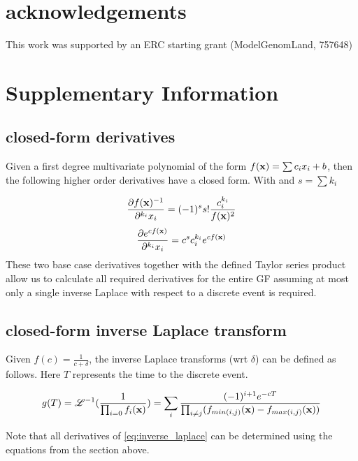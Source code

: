 \documentclass[10pt, a4]{article}
\newcommand{\beginsupplement}{%
        \setcounter{table}{0}
        \renewcommand{\thetable}{S\arabic{table}}%
        \setcounter{figure}{0}
        \renewcommand{\thefigure}{S\arabic{figure}}%
     }
\begin{document}
\section*{acknowledgements}
This work was supported by an ERC starting grant (ModelGenomLand, 757648)


\beginsupplement
\newpage
\section*{Supplementary Information}
\setcounter{equation}{0}
\setcounter{figure}{0}
\setcounter{table}{0}
\setcounter{page}{1}
\makeatletter
\renewcommand{\theequation}{S\arabic{equation}}
\renewcommand{\thefigure}{S\arabic{figure}}
\renewcommand{\bibnumfmt}[1]{[S#1]}
\renewcommand{\citenumfont}[1]{S#1}

\subsection*{closed-form derivatives}
Given a first degree multivariate polynomial of the form $f(\bold{x}) = \sum c_ix_i + b$, then the following higher order derivatives have a closed form. With and $s = \sum k_i$

\begin{equation} \label{eq:deriv_polynomial}
\frac{\partial f(\bold{x})^{-1}}{\partial^{k_i} x_i} = (-1)^s s! \frac{c^{k_i}_i}{f(\bold{x})^2}
\end{equation}
%
\begin{equation} \label{eq:deriv_exponential}
\frac{\partial e^{c f(\bold{x})}}{\partial^{k_i} x_i} = c^sc_i^{k_i}e^{cf(\bold{x})}	
\end{equation}
These two base case derivatives together with the defined Taylor series product allow us to calculate all required derivatives for the entire GF assuming at most only a single inverse Laplace with respect to a discrete event is required.

\subsection*{closed-form inverse Laplace transform}
Given $f(c) = \frac{1}{c+\delta}$, the inverse Laplace transforms (wrt $\delta$) can be defined as follows. Here $T$ represents the time to the discrete event.

\begin{equation} \label{eq:inverse_laplace}
g(T) = \mathscr{L}^{-1}(\frac{1}{\prod_{i=0} f_i(\bold{x})}) = \sum_i \frac{(-1)^{i+1} e^{-cT}}{\prod_{i\neq j} (f_{min(i,j)}(\bold{x})-f_{max(i,j)}(\bold{x}))}
\end{equation}

Note that all derivatives of \ref{eq:inverse_laplace} can be determined using the equations from the section above.
\end{document}
